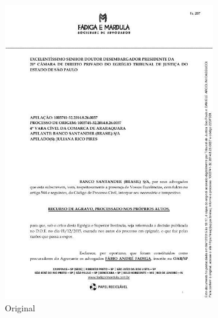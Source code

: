 \begin{figure}[H]
  \centering
  \caption{Exemplo de correção de ruído de imagem.}

  \begin{subfigure}[t]{.3\linewidth}
    \includegraphics[width=\textwidth]{figuras/991665_310196612_46.jpg}
    \caption{Original}
  \end{subfigure}
  \begin{subfigure}[t]{.3\linewidth}

\end{subfigure}
\end{figure}
